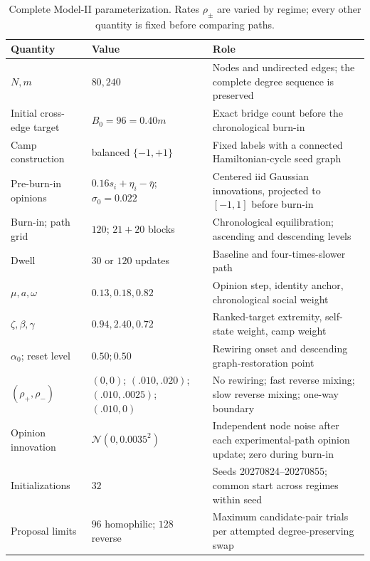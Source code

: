 \documentclass[pdflatex,sn-mathphys-num]{sn-jnl}
\begin{document}
\begin{table}[!htbp]
\centering
\caption{Complete Model-II parameterization. Rates $\rho_\pm$ are varied by regime; every other quantity is fixed before comparing paths.}
\label{tab:model-ii-parameters}
\small
\begin{tabularx}{\textwidth}{|p{2.6cm}|p{2.0cm}|Y|}
\hline
\textbf{Quantity} & \textbf{Value} & \textbf{Role}\\
\hline
$N,m$ & $80,240$ & Nodes and undirected edges; the complete degree sequence is preserved\\
\hline
Initial cross-edge target & $B_0=96=0.40m$ & Exact bridge count before the chronological burn-in\\
\hline
Camp construction & balanced $\{-1,+1\}$ & Fixed labels with a connected Hamiltonian-cycle seed graph\\
\hline
Pre-burn-in opinions & $0.16s_i+\eta_i-\bar\eta$; $\sigma_0=0.022$ & Centered iid Gaussian innovations, projected to $[-1,1]$ before burn-in\\
\hline
Burn-in; path grid & $120$; $21+20$ blocks & Chronological equilibration; ascending and descending levels\\
\hline
Dwell & $30$ or $120$ updates & Baseline and four-times-slower path\\
\hline
$\mu,a,\omega$ & $0.13,0.18,0.82$ & Opinion step, identity anchor, chronological social weight\\
\hline
$\zeta,\beta,\gamma$ & $0.94,2.40,0.72$ & Ranked-target extremity, self-state weight, camp weight\\
\hline
$\alpha_0$; reset level & $0.50;0.50$ & Rewiring onset and descending graph-restoration point\\
\hline
$(\rho_+,\rho_-)$ & $(0,0)$; $(.010,.020)$; $(.010,.0025)$; $(.010,0)$ & No rewiring; fast reverse mixing; slow reverse mixing; one-way boundary\\
\hline
Opinion innovation & $\mathcal N(0,0.0035^2)$ & Independent node noise after each experimental-path opinion update; zero during burn-in\\
\hline
Initializations & $32$ & Seeds 20270824--20270855; common start across regimes within seed\\
\hline
Proposal limits & $96$ homophilic; $128$ reverse & Maximum candidate-pair trials per attempted degree-preserving swap\\
\hline
\end{tabularx}
\end{table}
\end{document}
